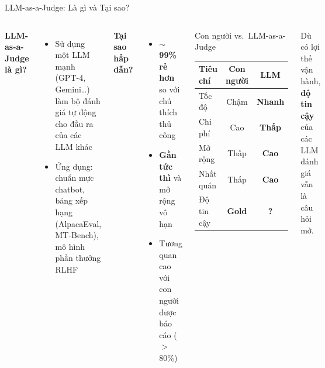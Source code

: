\documentclass[aspectratio=169,10pt]{beamer}
\newcommand{\good}[1]{\textcolor{green!60!black}{\textbf{#1}}}
\newcommand{\bad}[1]{\textcolor{aclred}{\textbf{#1}}}
\begin{document}
\begin{frame}{LLM-as-a-Judge: Là gì và Tại sao?}
  \begin{columns}[T]
      \textbf{LLM-as-a-Judge là gì?}
      \begin{itemize}
        \item Sử dụng một LLM mạnh (GPT-4, Gemini…) làm \alert{bộ đánh giá tự động} cho đầu ra của các LLM khác
        \item Ứng dụng: chuẩn mực chatbot, bảng xếp hạng (AlpacaEval, MT-Bench), mô hình phần thưởng RLHF
      \end{itemize}

      \vspace{0.6em}
      \textbf{Tại sao hấp dẫn?}
      \begin{itemize}
        \item \good{$\sim$99\% rẻ hơn} so với chú thích thủ công
        \item \good{Gần tức thì} và mở rộng vô hạn
        \item Tương quan cao với con người được báo cáo ($>$80\%)
      \end{itemize}

      \begin{block}{Con người vs.\ LLM-as-a-Judge}
        \small
        \begin{tabular}{lcc}
          \toprule
          \textbf{Tiêu chí} & \textbf{Con người} & \textbf{LLM} \\
          \midrule
          Tốc độ       & Chậm   & \good{Nhanh}  \\
          Chi phí      & Cao    & \good{Thấp}   \\
          Mở rộng & Thấp & \good{Cao}  \\
          Nhất quán    & Thấp   & \good{Cao}    \\
          Độ tin cậy   & \good{Gold} & \bad{?}  \\
          \bottomrule
        \end{tabular}
      \end{block}
      \vspace{0.4em}
      \small\alert{Dù có lợi thế vận hành, \textbf{độ tin cậy} của các LLM đánh giá vẫn là câu hỏi mở.}
  \end{columns}
\end{frame}
\end{document}
